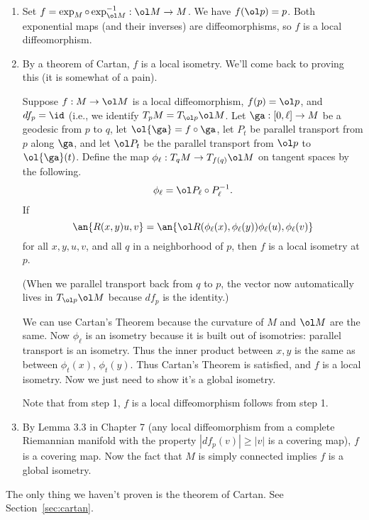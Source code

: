 \begin{enumerate}
\item
Set $f=\exp_M\circ \exp_{\ol M}^{-1}:\ol M\to M$. We have $f(\ol p)=p$. Both exponential maps (and their inverses) are diffeomorphisms, so $f$ is a local diffeomorphism.
\item
By a theorem of Cartan, $f$ is a local isometry. We'll come back to proving this (it is somewhat of a pain).
\begin{thm}[Cartan]
Suppose $f:M\to \ol M$ is a local diffeomorphism, $f(p)=\ol p$, and $df_p=\id$ (i.e., we identify $T_pM=T_{\ol p}\ol M$. Let $\ga:[0,\ell]\to M$ be a geodesic from $p$ to $q$, let $\ol{\ga}=f\circ \ga$, let $P_t$ be parallel transport from $p$ along $\ga$, and let $\ol P_t$ be the parallel transport from $\ol p$ to $\ol{\ga}(t)$. Define the map $\phi_{\ell}:T_qM\to T_{f(q)}\ol M$ on tangent spaces by the following.
\[
\phi_{\ell}=\ol P_{\ell}\circ P_{\ell}^{-1}.
\]
If 
\[\an{R(x,y)u,v}=\an{\ol R(\phi_{\ell}(x),\phi_{\ell}(y))\phi_{\ell}(u),\phi_{\ell}(v)}
\] for all $x,y,u,v$, and all $q$ in a neighborhood of $p$, then $f$ is a local isometry at $p$. %
\end{thm}

(When we parallel transport back from $q$ to $p$, the vector now automatically lives in $T_{\ol p}\ol M$ because $df_p$ is the identity.)

We can use Cartan's Theorem because the curvature of $M$ and $\ol M$ are the same. %
Now $\phi_{\ell}$ is %
an isometry because it is built out of isomotries: parallel transport is an isometry. Thus the inner product between $x,y$ is the same as between $\phi_t(x)$, $\phi_t(y)$. %
Thus Cartan's Theorem is satisfied, and $f$ is a local isometry. Now we just need to show it's a global isometry.

Note that from step 1, $f$ is a local diffeomorphism follows from step 1.%
\item
By Lemma 3.3 in Chapter 7 (any local diffeomorphism  from a complete Riemannian manifold with the property $|df_p(v)|\ge |v|$ is a covering map), $f$ is a covering map. Now the fact that $M$ is simply connected implies $f$ is a global isometry.
\end{enumerate}
The only thing we haven't proven is the theorem of Cartan. See Section~\ref{sec:cartan}.

